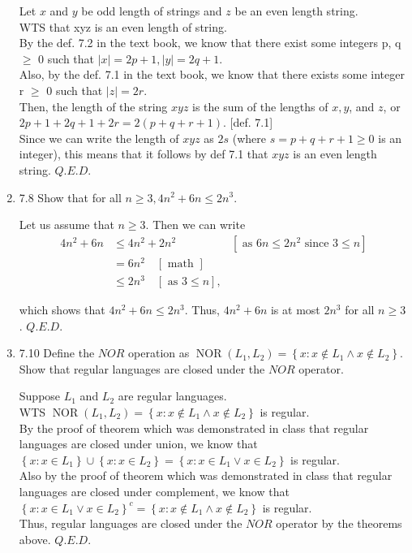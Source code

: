 \documentclass[10pt]{article}
\begin{document}
\begin{enumerate}[label={}]
          Let $x$ and $y$ be odd length of strings and $z$ be an even length string.\\
          WTS that xyz is an even length of string.\\
          By the def. 7.2 in the text book, we know that there exist some integers p, q $\geq$ 0 such that $|x|=2 p+1,|y|=2 q+1$.\\
          Also, by the def. 7.1 in the text book, we know that there exists some integer r $\geq$ 0 such that $|z|=2 r$.\\
          Then, the length of the string $x y z$ is the sum of the lengths of $x, y$, and $z$, or $2 p+1+2 q+1+2 r=2(p+q+r+1)$. [def. 7.1]\\
          Since we can write the length of $x y z$ as $2s$ (where $s=p+q+r+1 \geq 0$ is an integer), this means that it follows by def 7.1 that $x y z$ is an even length string. $Q.E.D.$\\


    \item 7.8 Show that for all $n \geq 3,4 n^2+6 n \leq 2 n^3$.

          Let us assume that $n \geq 3$. Then we can write
          $$
              \begin{aligned}
                  4 n^2+6 n & \leq 4 n^2+2 n^2
                            & {\left[\text { as } 6 n \leq 2 n^2 \text { since } 3 \leq n\right] } \\
                            & = 6 n^2 \quad[\text { math }]                                        \\
                            & \leq 2 n^3 \quad[\text { as } 3 \leq n],
              \end{aligned}
          $$

          which shows that $4 n^2+6 n \leq 2 n^3$.
          Thus, $4 n^2+6 n$ is at most $2 n^3$ for all $n \geq 3$. $Q.E.D.$\\

    \item 7.10 Define the $N O R$ operation as $\operatorname{NOR}\left(L_1, L_2\right)=\left\{x: x \notin L_1 \wedge x \notin L_2\right\}$. Show that regular languages are closed under the $N O R$ operator.

          Suppose $L_1$ and $L_2$ are regular languages.\\
          WTS $\operatorname{NOR}\left(L_1, L_2\right)=\left\{x: x \notin L_1 \wedge x \notin L_2\right\}$ is regular.\\
          By the proof of theorem which was demonstrated in class that regular languages are closed under union, we know that
          $\left\{x: x \in L_1\right\} \cup \left\{x:x \in L_2\right\} = \left\{x: x \in L_1 \vee x \in L_2\right\}$ is regular.\\
          Also by the proof of theorem which was demonstrated in class that regular languages are closed under complement, we know that $\left\{x: x \in L_1 \vee x \in L_2\right\}^c = \left\{x: x \notin L_1 \wedge x \notin L_2\right\}$ is regular. \\
          Thus, regular languages are closed under the $N O R$ operator by the theorems above. $Q.E.D.$


\end{enumerate}
\end{document}
